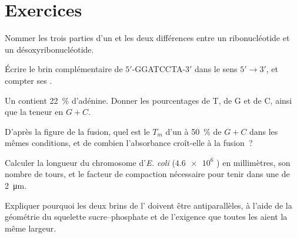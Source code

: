 \section{Exercices}

\begin{exercise}[$\star$]\label{exo:b1:nucleic-acids:1}
Nommer les trois parties d'un  et les deux différences entre
un ribonucléotide et un désoxyribonucléotide.
\end{exercise}

\begin{exercise}[$\star$]\label{exo:b1:nucleic-acids:2}
Écrire le brin complémentaire de $5'$-GGATCCTA-$3'$ dans le sens
$5' \to 3'$, et compter ses .
\end{exercise}

\begin{exercise}[$\star$]\label{exo:b1:nucleic-acids:3}
Un  contient \qty{22}{\%} d'adénine. Donner les pourcentages de T, de
G et de C, ainsi que la teneur en $G + C$.
\end{exercise}

\begin{exercise}[$\star$]\label{exo:b1:nucleic-acids:4}
D'après la figure de la fusion, quel est le $T_m$ d'un  à
\qty{50}{\%} de $G + C$ dans les mêmes conditions, et de combien
l'absorbance croît-elle à la fusion~?
\end{exercise}

\begin{exercise}[$\star\star$]\label{exo:b1:nucleic-acids:5}
Calculer la longueur du chromosome d'\emph{E. coli} ($\num{4.6e6}$
) en millimètres, son nombre de tours, et le facteur de
compaction nécessaire pour tenir dans une  de \qty{2}{\micro m}.
\end{exercise}

\begin{exercise}[$\star\star$]\label{exo:b1:nucleic-acids:6}
Expliquer pourquoi les deux brins de l' doivent être antiparallèles,
à l'aide de la géométrie du squelette sucre--phosphate et de l'exigence
que toutes les  aient la même largeur.
\end{exercise}

